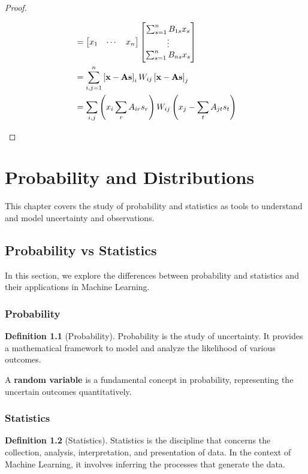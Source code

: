 \documentclass[12pt,openany]{book}
\theoremstyle{definition}
\newtheorem{definition}{Definition}[chapter]
\newcommand{\of}[1]{\left( #1 \right)}
\renewcommand{\vec}[1]{\textbf{#1}}
\begin{document}
\begin{proof}
\begin{enumerate}[(1)]
\begin{align*}
			&=\begin{bmatrix}
				x_1 & \cdots & x_n
			\end{bmatrix}\begin{bmatrix}
				\sum_{s=1}^nB_{1s}x_s \\ \vdots \\ \sum_{s=1}^nB_{ns}x_s
			\end{bmatrix}\\
			&=\sum_{i,j=1}^n\sbr{\vec{x}-\vec{A}\vec{s}}_iW_{ij}\sbr{\vec{x}-\vec{A}\vec{s}}_j\\
			&=\sum_{i,j}\of{x_i\sum_{r}A_{ir}s_r}W_{ij}\of{x_j-\sum_{t}A_{jt}s_t}
		\end{align*}
	\end{enumerate}
\end{proof}

	\newpage
	\chapter{Probability and Distributions}
	
	This chapter covers the study of probability and statistics as tools to understand and model uncertainty and observations.
	
	\section{Probability vs Statistics}
	In this section, we explore the differences between probability and statistics and their applications in Machine Learning.
	
	\subsection{Probability}
	\begin{definition}[Probability]
		Probability is the study of uncertainty. It provides a mathematical framework to model and analyze the likelihood of various outcomes.
	\end{definition}
	
	A \textbf{random variable} is a fundamental concept in probability, representing the uncertain outcomes quantitatively.
	
	\subsection{Statistics}
	\begin{definition}[Statistics]
		Statistics is the discipline that concerns the collection, analysis, interpretation, and presentation of data. In the context of Machine Learning, it involves inferring the processes that generate the data.
	\end{definition}
	
\end{document}
